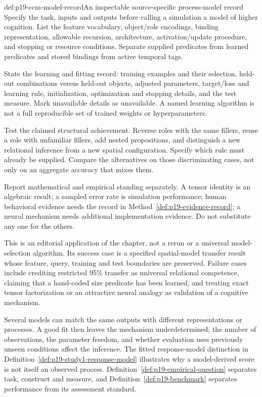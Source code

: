 \begin{hbmethod}{def:p19-ccm-model-record}{An inspectable source-specific process-model record}
Specify the task, inputs and outputs before calling a simulation a
model of higher cognition. List the feature vocabulary, object/role
encodings, binding representation, allowable recursion, architecture,
activation/update procedure, and stopping or resource conditions.
Separate supplied predicates from learned predicates and stored bindings
from active temporal tags.

State the learning and fitting record: training examples and their
selection, held-out combinations versus held-out objects, adjusted
parameters, target/loss and learning rule, initialization, optimization
and stopping details, and the test measure. Mark unavailable details
as unavailable. A named learning algorithm is not a full reproducible
set of trained weights or hyperparameters.

Test the claimed structural achievement. Reverse roles with the same
fillers, reuse a role with unfamiliar fillers, add nested propositions,
and distinguish a new relational inference from a new spatial
configuration. Specify which rule must already be supplied. Compare
the alternatives on those discriminating cases, not only on an aggregate
accuracy that mixes them.

Report mathematical and empirical standing separately. A tensor
identity is an algebraic result; a sampled error rate is simulation
performance; human behavioral evidence needs the record in
Method~\ref{def:p19-evidence-record}; a neural mechanism needs additional
implementation evidence. Do not substitute any one for the others.
\end{hbmethod}

This is an editorial application of the chapter, not a rerun or a
universal model-selection algorithm. Its success case is a specified
spatial-model transfer result whose feature, query, training and test
boundaries are preserved. Failure cases include crediting restricted
95\% transfer as universal relational competence, claiming that a
hand-coded size predicate has been learned, and treating exact tensor
factorization or an attractive neural analogy as validation of a
cognitive mechanism.

Several models can match the same outputs with different representations
or processes. A good fit then leaves the mechanism underdetermined;
the number of observations, the parameter freedom, and whether evaluation
uses previously unseen conditions affect the inference. The fitted
response-model distinction in
Definition~\ref{def:p19-study1-response-model} illustrates why a
model-derived score is not itself an observed process.
Definition~\ref{def:p19-empirical-question} separates task, construct and measure,
and Definition~\ref{def:p19-benchmark} separates performance from its
assessment standard.

